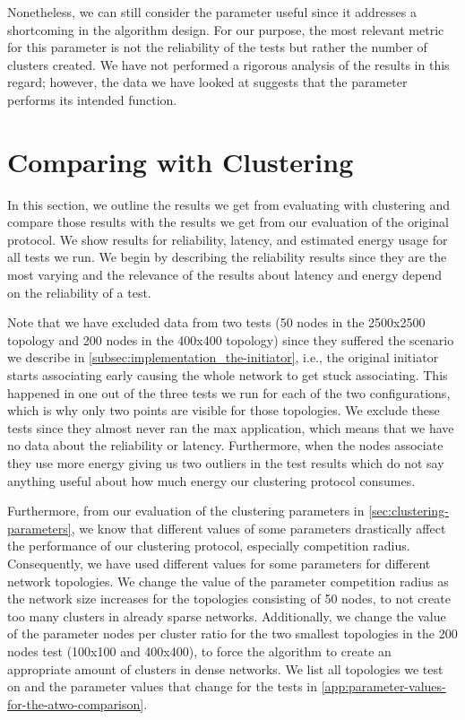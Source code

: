 Nonetheless, we can still consider the parameter useful since it addresses a shortcoming in the algorithm design. For our purpose, the most relevant metric for this parameter is not the reliability of the tests but rather the number of clusters created. We have not performed a rigorous analysis of the results in this regard; however, the data we have looked at suggests that the parameter performs its intended function.



\section{Comparing \atwo{} with Clustering}
In this section, we outline the results we get from evaluating \atwo{} with clustering and compare those results with the results we get from our evaluation of the original \atwo{} protocol. We show results for reliability, latency, and estimated energy usage for all tests we run. We begin by describing the reliability results since they are the most varying and the relevance of the results about latency and energy depend on the reliability of a test.

Note that we have excluded data from two tests (50 nodes in the 2500x2500 topology and 200 nodes in the 400x400 topology) since they suffered the scenario we describe in \cref{subsec:implementation_the-initiator}, i.e., the original initiator starts associating early causing the whole network to get stuck associating. This happened in one out of the three tests we run for each of the two configurations, which is why only two points are visible for those topologies. We exclude these tests since they almost never ran the max application, which means that we have no data about the reliability or latency. Furthermore, when the nodes associate they use more energy giving us two outliers in the test results which do not say anything useful about how much energy our clustering protocol consumes.

Furthermore, from our evaluation of the clustering parameters in \cref{sec:clustering-parameters}, we know that different values of some parameters drastically affect the performance of our clustering protocol, especially competition radius. Consequently, we have used different values for some parameters for different network topologies. We change the value of the parameter competition radius as the network size increases for the topologies consisting of 50 nodes, to not create too many clusters in already sparse networks. Additionally, we change the value of the parameter nodes per cluster ratio for the two smallest topologies in the 200 nodes test (100x100 and 400x400), to force the algorithm to create an appropriate amount of clusters in dense networks. We list all topologies we test on and the parameter values that change for the tests in \cref{app:parameter-values-for-the-atwo-comparison}.


